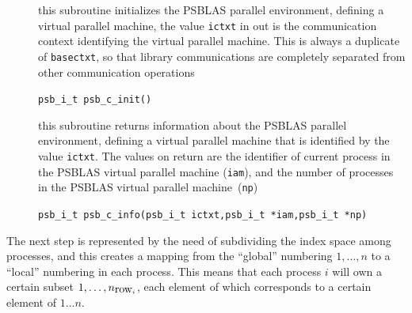 \documentclass[twoside,a4paper]{refart}
\theoremstyle{definition}
\begin{document}
\begin{description}
	\item[] this subroutine initializes the PSBLAS parallel environment, defining a virtual parallel machine, the value \texttt{ictxt} in out is the communication context identifying the virtual parallel machine.
	This is always a duplicate of \texttt{basectxt}, so that library communications are completely separated from other communication operations
	
	 \lstinline[style=CStyle]|psb_i_t psb_c_init()|
	
	\item[] this subroutine returns information about the PSBLAS parallel environment, defining a virtual parallel machine that is identified by the value \texttt{ictxt}. The values on return are the identifier of current process in the PSBLAS virtual parallel machine (\texttt{iam}), and the number of processes in the PSBLAS virtual parallel machine~(\texttt{np})
	
	 \lstinline[style=CStyle]|psb_i_t psb_c_info(psb_i_t ictxt,psb_i_t *iam,psb_i_t *np)|
	
\end{description}	
	
	The next step is represented by the need of subdividing the index space among processes, and this creates a mapping from the ``global'' numbering $1,\ldots,n$ to a ``local'' numbering
	in each process. This means that each process $i$ will own a certain subset
	$1,\ldots,n_{\hbox{row}_i}$, each element of which corresponds to a certain element of $1\dots n$.
	
\end{document}
